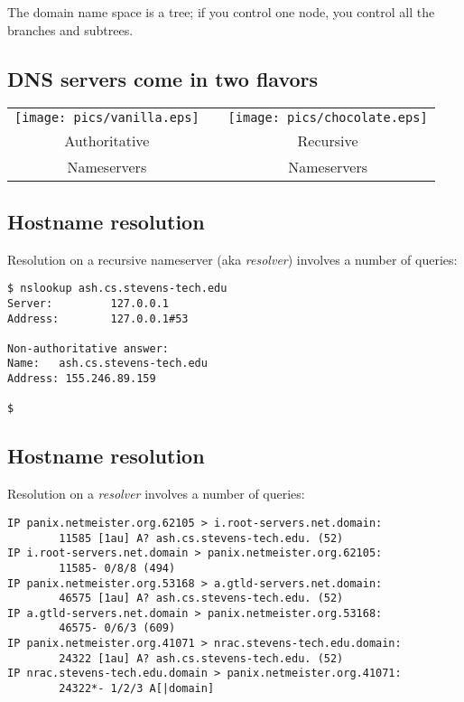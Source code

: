 \documentclass[xga]{xdvislides}
\begin{document}
\vspace{.5in}
The domain name space is a tree; if you control one
node, you control all the branches and subtrees.

\subsection{DNS servers come in two flavors}
\vspace*{\fill}
\begin{center}
	\begin{tabular}{ c c c }
	\texttt{[image: pics/vanilla.eps]} & \hspace{.5in} & \texttt{[image: pics/chocolate.eps]} \\
	\hspace{.3in} \Huge Authoritative & & \hspace{.3in} \Huge Recursive \\
	\hspace{.3in} \Huge Nameservers & & \hspace{.3in} \Huge Nameservers \\
	\end{tabular}
\end{center}
\vspace*{\fill}

\subsection{Hostname resolution}
Resolution on a recursive nameserver (aka {\em resolver}) involves a number of queries:
\vspace{.5in}
\begin{verbatim}
$ nslookup ash.cs.stevens-tech.edu
Server:         127.0.0.1
Address:        127.0.0.1#53

Non-authoritative answer:
Name:   ash.cs.stevens-tech.edu
Address: 155.246.89.159

$
\end{verbatim}

\subsection{Hostname resolution}
Resolution on a {\em resolver} involves a number of queries:
\begin{verbatim}
IP panix.netmeister.org.62105 > i.root-servers.net.domain:
        11585 [1au] A? ash.cs.stevens-tech.edu. (52)
IP i.root-servers.net.domain > panix.netmeister.org.62105:
        11585- 0/8/8 (494)
IP panix.netmeister.org.53168 > a.gtld-servers.net.domain:
        46575 [1au] A? ash.cs.stevens-tech.edu. (52)
IP a.gtld-servers.net.domain > panix.netmeister.org.53168:
        46575- 0/6/3 (609)
IP panix.netmeister.org.41071 > nrac.stevens-tech.edu.domain:
        24322 [1au] A? ash.cs.stevens-tech.edu. (52)
IP nrac.stevens-tech.edu.domain > panix.netmeister.org.41071:
        24322*- 1/2/3 A[|domain]
\end{verbatim}
\Normalsize
\end{document}
